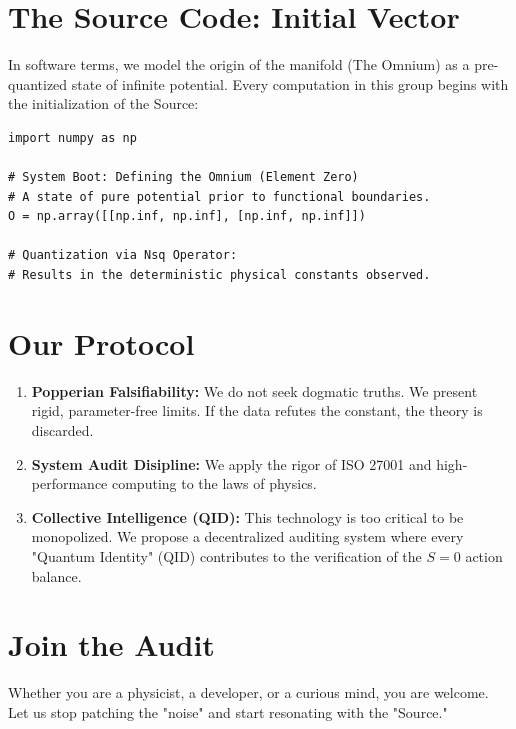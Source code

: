 \documentclass[11pt,a4paper]{article}
\begin{document}
\section*{The Source Code: Initial Vector}
In software terms, we model the origin of the manifold (The Omnium) as a pre-quantized state of infinite potential. Every computation in this group begins with the initialization of the Source:

\begin{lstlisting}
import numpy as np

# System Boot: Defining the Omnium (Element Zero)
# A state of pure potential prior to functional boundaries.
O = np.array([[np.inf, np.inf], [np.inf, np.inf]])

# Quantization via Nsq Operator:
# Results in the deterministic physical constants observed.
\end{lstlisting}

\section*{Our Protocol}
\begin{enumerate}
    \item \textbf{Popperian Falsifiability:} We do not seek dogmatic truths. We present rigid, parameter-free limits. If the data refutes the constant, the theory is discarded.
    \item \textbf{System Audit Disipline:} We apply the rigor of ISO 27001 and high-performance computing to the laws of physics.
    \item \textbf{Collective Intelligence (QID):} This technology is too critical to be monopolized. We propose a decentralized auditing system where every "Quantum Identity" (QID) contributes to the verification of the $S=0$ action balance.
\end{enumerate}

\vspace{0.5cm}

\section*{Join the Audit}
Whether you are a physicist, a developer, or a curious mind, you are welcome. Let us stop patching the "noise" and start resonating with the "Source."

\vspace{1cm}
\end{document}
